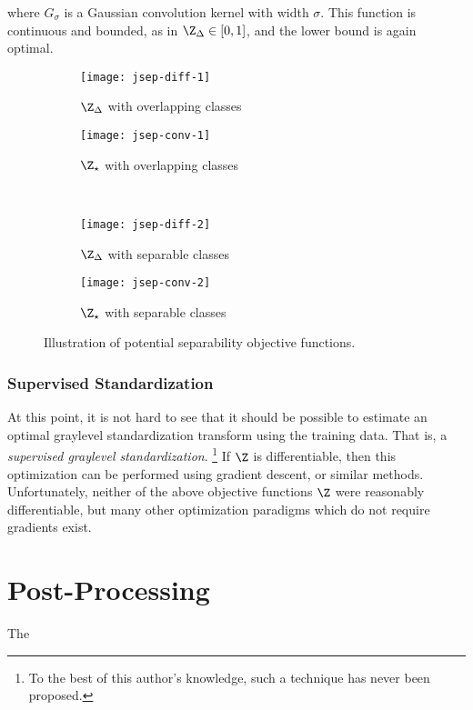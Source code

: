 where $G_{\sigma}$ is a Gaussian convolution kernel with width $\sigma$.
This function is continuous and bounded, as in $\Z_{\Delta}\in\left[0,1\right]$, and the lower bound is again optimal.
\par
\begin{figure}
  \centering
  \begin{subfigure}{\plotwidth}\texttt{[image: jsep-diff-1]}\caption{$\Z_{\Delta}$ with overlapping classes}\label{fig:jsep-diff-1}\end{subfigure}
  \begin{subfigure}{\plotwidth}\texttt{[image: jsep-conv-1]}\caption{$\Z_{\star}$ with overlapping classes}\label{fig:jsep-conv-1}\end{subfigure}\\[1em]
  \begin{subfigure}{\plotwidth}\texttt{[image: jsep-diff-2]}\caption{$\Z_{\Delta}$ with separable classes}\label{fig:jsep-diff-2}\end{subfigure}
  \begin{subfigure}{\plotwidth}\texttt{[image: jsep-conv-2]}\caption{$\Z_{\star}$ with separable classes}\label{fig:jsep-conv-2}\end{subfigure}
  \caption{Illustration of potential separability objective functions.}
  \label{fig:jsep}
\end{figure}
\subsubsection{Supervised Standardization}
At this point, it is not hard to see that it should be possible to estimate an optimal graylevel standardization transform using the training data.
That is, a \textit{supervised graylevel standardization}.%
\footnote{To the best of this author's knowledge, such a technique has never been proposed.}
If $\Z$ is differentiable, then this optimization can be performed using gradient descent, or similar methods.
Unfortunately, neither of the above objective functions $\Z$ were reasonably differentiable, but many other optimization paradigms which do not require gradients exist.
\section{Post-Processing}\label{s:meth-post}
The 

